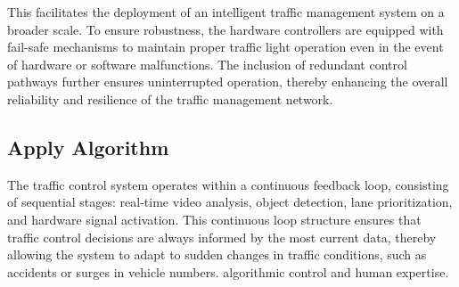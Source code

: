 \documentclass[usenatbib]{tjaa}
\begin{document}
 This facilitates the deployment of an intelligent traffic management system on a broader scale. To ensure robustness, the hardware controllers are equipped with fail-safe mechanisms to maintain proper traffic light operation even in the event of hardware or software malfunctions. The inclusion of redundant control pathways further ensures uninterrupted operation, thereby enhancing the overall reliability and resilience of the traffic management network.


\subsection{Apply Algorithm}
The traffic control system operates within a continuous feedback loop, 
consisting of sequential stages: real-time video analysis, object detection, lane prioritization, and hardware signal activation. This continuous loop structure ensures that traffic control decisions are always informed by the most current data, thereby allowing the system to adapt to sudden changes in traffic conditions, such as accidents or surges in vehicle numbers.  algorithmic control and human expertise.
\end{document}
